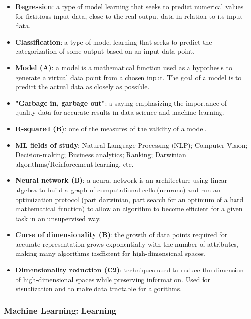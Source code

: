 \documentclass{article}
\begin{document}
\begin{itemize}
    \item \textbf{Regression}: a type of model learning that seeks to predict numerical values for fictitious input data, close to the real output data in relation to its input data.
    
    \item \textbf{Classification}: a type of model learning that seeks to predict the categorization of some output based on an input data point.
    
    \item \textbf{Model (A)}: a model is a mathematical function used as a hypothesis to generate a virtual data point from a chosen input. The goal of a model is to predict the actual data as closely as possible.

    \item \textbf{"Garbage in, garbage out"}: a saying emphasizing the importance of quality data for accurate results in data science and machine learning.

    \item \textbf{R-squared (B)}: one of the measures of the validity of a model.

    \item \textbf{ML fields of study}: Natural Language Processing (NLP); Computer Vision; Decision-making; Business analytics; Ranking; Darwinian algorithms/Reinforcement learning, etc.

    \item \textbf{Neural network (B)}: a neural network is an architecture using linear algebra to build a graph of computational cells (neurons) and run an optimization protocol (part darwinian, part search for an optimum of a hard mathematical function) to allow an algorithm to become efficient for a given task in an unsupervised way.

    \item \textbf{Curse of dimensionality (B)}: the growth of data points required for accurate representation grows exponentially with the number of attributes, making many algorithms inefficient for high-dimensional spaces.
    
    \item \textbf{Dimensionality reduction (C2)}: techniques used to reduce the dimension of high-dimensional spaces while preserving information. Used for visualization and to make data tractable for algorithms.
\end{itemize}


\subsubsection*{Machine Learning: Learning}
\end{document}
